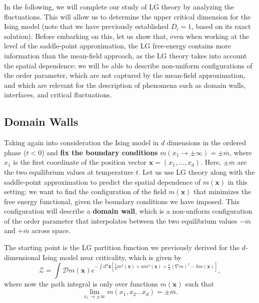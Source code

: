 In the following, we will complete our study of LG theory by analyzing the fluctuations. This will allow us to determine the upper critical dimension for the Ising model (note that we have previously established $D_l = 1$, based on its exact solution). Before embarking on this, let us show that, even when working at the level of the saddle-point approximation, the LG free-energy contains more information than the mean-field approach, as the LG theory takes into account the spatial dependence: we will be able to describe non-uniform configurations of the order parameter, which are not captured by the mean-field approximation, and which are relevant for the description of phenomena such as domain walls, interfaces, and critical fluctuations.

\subsection{Domain Walls}

Taking again into consideration the Ising model in \( d \) dimensions in the ordered phase (\( t < 0 \)) and \textbf{fix the boundary conditions} \( m(x_1 \to \pm\infty) = \pm\overline{m} \), where \( x_1 \) is the first coordinate of the position vector \( \mathbf{x} = (x_1, \dots, x_d) \). Here, \( \pm\overline{m} \) are the two equilibrium values at temperature \( t \). Let us use LG theory along with the saddle-point approximation to predict the spatial dependence of \( m(\mathbf{x}) \) in this setting: we want to find the configuration of the field \( m(\mathbf{x}) \) that minimizes the free energy functional, given the boundary conditions we have imposed. This configuration will describe a \textbf{domain wall}, which is a non-uniform configuration of the order parameter that interpolates between the two equilibrium values \( -\overline{m} \) and \( +\overline{m} \) across space.

The starting point is the LG partition function we previously derived for the \(d\)-dimensional Ising model near criticality, which is given by
\[
    \mathcal{Z} = \int \mathcal{D}m(\mathbf{x}) e^{-\int \mathrm{d}^d \mathbf{x} \left[ \frac{t}{2}m^2(\mathbf{x}) + u m^4(\mathbf{x}) + \frac{\kappa}{2}(\nabla m)^2 - h m(\mathbf{x}) \right]} ,
\]
where now the path integral is only over functions \( m(\mathbf{x}) \) such that
\[
    \lim_{x_1 \to \pm\infty} m(x_1, x_2 \dots x_d) = \pm\overline{m} .
\]

